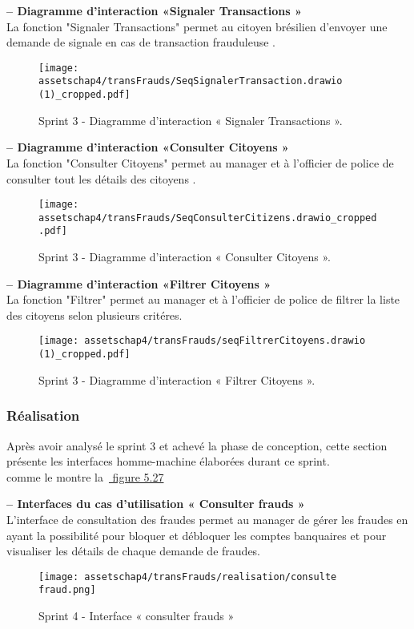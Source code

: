 \textbf{– Diagramme d'interaction «Signaler Transactions »}\\
La fonction "Signaler Transactions" permet au citoyen brésilien d'envoyer une demande de signale en cas de transaction frauduleuse .
\begin{figure}[H]
\centering
\texttt{[image: assetschap4/transFrauds/SeqSignalerTransaction.drawio (1)\_cropped.pdf]}
\caption{ Sprint 3 - Diagramme d'interaction « Signaler Transactions ». }
\end{figure}





\textbf{– Diagramme d'interaction «Consulter Citoyens »}\\
La fonction "Consulter Citoyens" permet au manager et à l'officier de police de consulter tout les détails des citoyens .
\begin{figure}[H]
\centering
\texttt{[image: assetschap4/transFrauds/SeqConsulterCitizens.drawio\_cropped.pdf]}
\caption{ Sprint 3 - Diagramme d'interaction « Consulter Citoyens ». }
\end{figure}





\textbf{– Diagramme d'interaction «Filtrer Citoyens »}\\
La fonction "Filtrer" permet au manager et à l'officier de police de filtrer la liste  des citoyens selon plusieurs critéres.
\begin{figure}[H]
\centering
\texttt{[image: assetschap4/transFrauds/seqFiltrerCitoyens.drawio (1)\_cropped.pdf]}
\caption{ Sprint 3 - Diagramme d'interaction « Filtrer Citoyens ». }
\end{figure}




\subsubsection{Réalisation}
Après avoir analysé le sprint 3 et achevé la phase de conception, cette section présente les
interfaces homme-machine élaborées durant ce sprint.\\
comme le montre la~\hyperref[fig:5.27]{ figure 5.27}


\textbf{– Interfaces du cas d'utilisation « Consulter frauds »}\\
L'interface de consultation des fraudes permet au manager de gérer les fraudes en ayant la possibilité pour bloquer et débloquer les comptes banquaires et pour visualiser les détails de chaque demande de fraudes.
\begin{figure}[H]
    \centering
    \texttt{[image: assetschap4/transFrauds/realisation/consulte fraud.png]}
    \caption{ Sprint 4 - Interface « consulter frauds »}
    \label{fig:5.27}
\end{figure}








